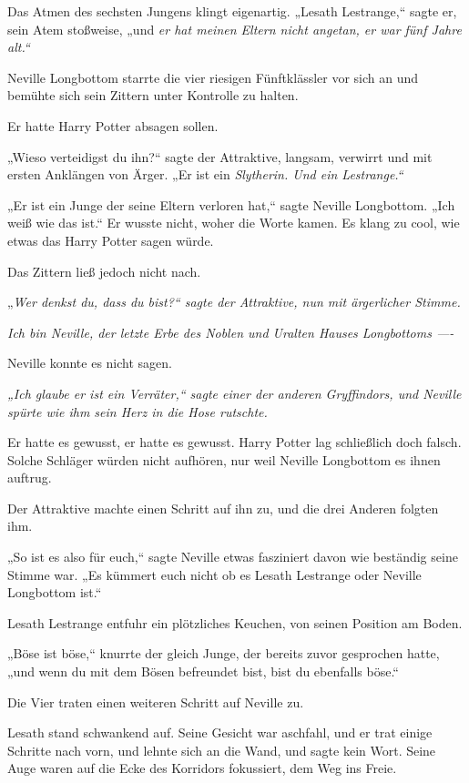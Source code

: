 {Das Atmen des sechsten Jungens klingt eigenartig. „Lesath Lestrange,“ sagte er, sein Atem stoßweise, „und \emph{er hat meinen Eltern nicht angetan, er war fünf Jahre alt.“}

Neville Longbottom starrte die vier riesigen Fünftklässler vor sich an und bemühte sich sein Zittern unter Kontrolle zu halten.

Er hatte Harry Potter absagen sollen.

„Wieso verteidigst du ihn?“ sagte der Attraktive, langsam, verwirrt und mit ersten Anklängen von Ärger. „Er ist ein \emph{Slytherin. Und ein \emph{Lestrange.“}}

„Er ist ein Junge der seine Eltern verloren hat,“ sagte Neville Longbottom. „Ich weiß wie das ist.“ Er wusste nicht, woher die Worte kamen. Es klang zu cool, wie etwas das Harry Potter sagen würde.

Das Zittern ließ jedoch nicht nach.

„\emph{Wer denkst du, dass du bist?“ sagte der Attraktive, nun mit ärgerlicher Stimme.}

\emph{Ich bin Neville, der letzte Erbe des Noblen und Uralten Hauses Longbottoms ----}

Neville konnte es nicht sagen.

\emph{„Ich glaube er ist ein Verräter,“ sagte einer der anderen Gryffindors, und Neville spürte wie ihm sein Herz in die Hose rutschte.}

Er hatte es gewusst, er hatte es gewusst. Harry Potter lag schließlich doch falsch. Solche Schläger würden nicht aufhören, nur weil Neville Longbottom es ihnen auftrug.

Der Attraktive machte einen Schritt auf ihn zu, und die drei Anderen folgten ihm.

„So ist es also für euch,“ sagte Neville etwas fasziniert davon wie beständig seine Stimme war. „Es kümmert euch nicht ob es Lesath Lestrange oder Neville Longbottom ist.“

Lesath Lestrange entfuhr ein plötzliches Keuchen, von seinen Position am Boden.

„Böse ist böse,“ knurrte der gleich Junge, der bereits zuvor gesprochen hatte, „und wenn du mit dem Bösen befreundet bist, bist du ebenfalls böse.“

Die Vier traten einen weiteren Schritt auf Neville zu.

Lesath stand schwankend auf. Seine Gesicht war aschfahl, und er trat einige Schritte nach vorn, und lehnte sich an die Wand, und sagte kein Wort. Seine Auge waren auf die Ecke des Korridors fokussiert, dem Weg ins Freie.

}
